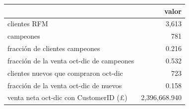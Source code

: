\begin{tabular}{lr}
\toprule
 & valor \\
\midrule
clientes RFM & 3,613 \\
campeones & 781 \\
fracción de clientes campeones & 0.216 \\
fracción de la venta oct-dic de campeones & 0.532 \\
clientes nuevos que compraron oct-dic & 723 \\
fracción de la venta oct-dic de nuevos & 0.158 \\
venta neta oct-dic con CustomerID (£) & 2,396,668.940 \\
\bottomrule
\end{tabular}
